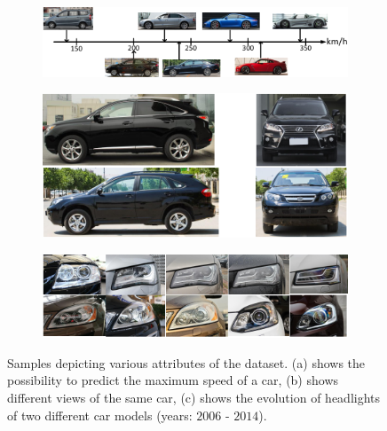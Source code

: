 \begin{figure}[t]
    \centering
    \begin{subfigure}[b]{0.75\textwidth}
        \centering
        \includegraphics[width=\textwidth]{figures/datasets/compcars_speed.pdf}
        \caption[]{}
    \end{subfigure}
    \begin{subfigure}[b]{0.4\textwidth}
        \centering
        \includegraphics[width=\textwidth]{figures/datasets/compcars_side_front_views.pdf}
        \caption[]{}
    \end{subfigure}
    \hfill
    \begin{subfigure}[b]{0.4\textwidth}
        \centering
        \includegraphics[width=\textwidth]{figures/datasets/compcars_headlights.pdf}
        \caption[]{}
    \end{subfigure}
    \caption[Attributes of the  dataset]{Samples depicting various attributes of the  dataset. (a) shows the possibility to predict the maximum speed of a car, (b) shows different views of the same car, (c) shows the evolution of headlights of two different car models (years: $2006$ - $2014$). }
    \label{fig:DatasetCompCarsAttributes}
\end{figure}

